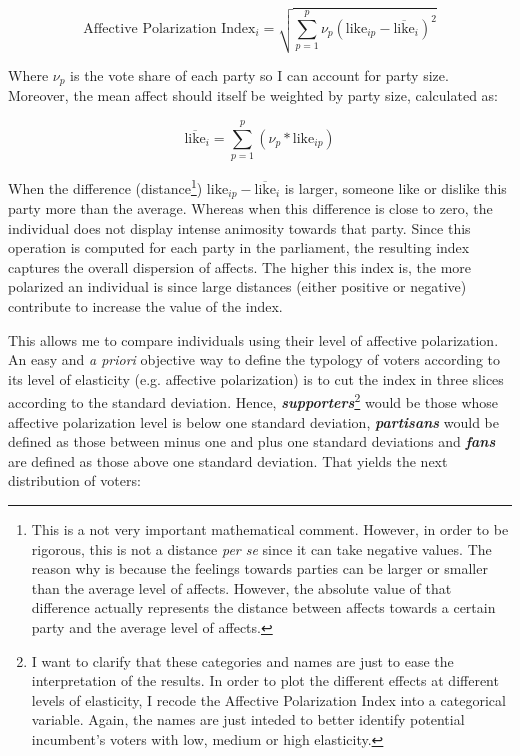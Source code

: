 \documentclass[a4paper, svgnames]{article}
\begin{document}
$$
	\text{Affective Polarization Index}_i = \sqrt{\sum^p_{p=1}\nu_p(\text{like}_{ip}-\overline{\text{like}}_i)^2}
$$

Where $\nu_p$ is the vote share of each party so I can account for party size. Moreover, the mean affect should itself be weighted by party size, calculated as:

$$
	\overline{\text{like}}_i = \sum^p_{p=1} (\nu_p * \text{like}_{ip})
$$

When the difference (distance\footnote{This is a not very important mathematical comment. However, in order to be rigorous, this is not a distance \textit{per se} since it can take negative values. The reason why is because the feelings towards parties can be larger or smaller than the average level of affects. However, the absolute value of that difference actually represents the distance between affects towards a certain party and the average level of affects.}) $\text{like}_{ip}-\overline{\text{like}}_i$ is larger, someone like or dislike this party more than the average. Whereas when this difference is close to zero, the individual does not display intense animosity towards that party. Since this operation is computed for each party in the parliament, the resulting index captures the overall dispersion of affects. The higher this index is, the more polarized an individual is since large distances (either positive or negative) contribute to increase the value of the index.

This allows me to compare individuals using their level of affective polarization. An easy and \textit{a priori} objective way to define the typology of voters according to its level of elasticity (e.g. affective polarization) is to cut the index in three slices according to the standard deviation. Hence, \textit{\textbf{supporters}}\footnote{I want to clarify that these categories and names are just to ease the interpretation of the results. In order to plot the different effects at different levels of elasticity, I recode the Affective Polarization Index into a categorical variable. Again, the names are just inteded to better identify potential incumbent's voters with low, medium or high elasticity.} would be those whose affective polarization level is below one standard deviation, \textit{\textbf{partisans}} would be defined as those between minus one and plus one standard deviations and \textit{\textbf{fans}} are defined as those above one standard deviation. That yields the next distribution of voters:
\end{document}
